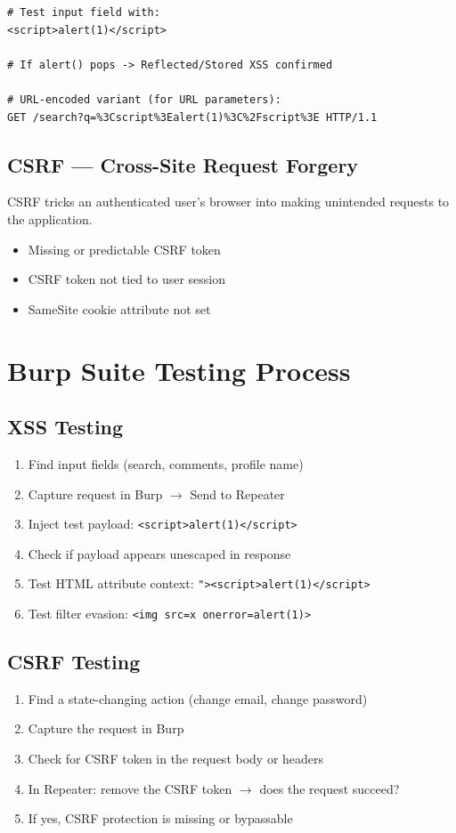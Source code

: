 \begin{lstlisting}[style=http, caption={Basic XSS test payload}]
# Test input field with:
<script>alert(1)</script>

# If alert() pops -> Reflected/Stored XSS confirmed

# URL-encoded variant (for URL parameters):
GET /search?q=%3Cscript%3Ealert(1)%3C%2Fscript%3E HTTP/1.1
\end{lstlisting}

\subsection{CSRF — Cross-Site Request Forgery}
CSRF tricks an authenticated user's browser into making unintended requests to the application.

\begin{itemize}
  \item Missing or predictable CSRF token
  \item CSRF token not tied to user session
  \item SameSite cookie attribute not set
\end{itemize}

\section{Burp Suite Testing Process}

\subsection{XSS Testing}
\begin{enumerate}
  \item Find input fields (search, comments, profile name)
  \item Capture request in Burp $\to$ Send to Repeater
  \item Inject test payload: \texttt{<script>alert(1)</script>}
  \item Check if payload appears unescaped in response
  \item Test HTML attribute context: \texttt{"><script>alert(1)</script>}
  \item Test filter evasion: \texttt{<img src=x onerror=alert(1)>}
\end{enumerate}

\subsection{CSRF Testing}
\begin{enumerate}
  \item Find a state-changing action (change email, change password)
  \item Capture the request in Burp
  \item Check for CSRF token in the request body or headers
  \item In Repeater: remove the CSRF token $\to$ does the request succeed?
  \item If yes, CSRF protection is missing or bypassable
\end{enumerate}

